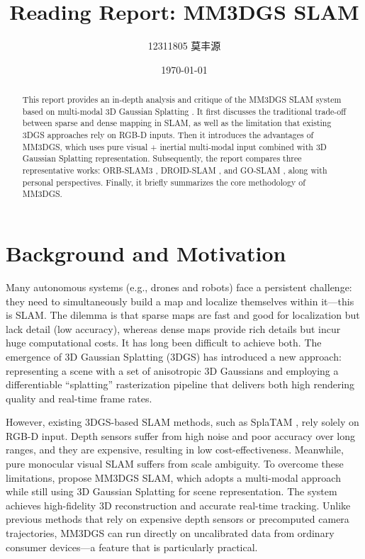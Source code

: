 \documentclass[12pt,a4paper,onecolumn]{article}
\begin{document}
\title{\textbf{Reading Report: MM3DGS SLAM}}
\author{12311805 莫丰源}
\date{\today}
\maketitle

\begin{abstract}
This report provides an in-depth analysis and critique of the MM3DGS SLAM system based on multi-modal 3D Gaussian Splatting \citep{MM3DGS}. It first discusses the traditional trade-off between sparse and dense mapping in SLAM, as well as the limitation that existing 3DGS approaches rely on RGB-D inputs. Then it introduces the advantages of MM3DGS, which uses pure visual + inertial multi-modal input combined with 3D Gaussian Splatting representation. Subsequently, the report compares three representative works: ORB-SLAM3 \citep{ORB-SLAM3}, DROID-SLAM \citep{DROID-SLAM}, and GO-SLAM \citep{GO-SLAM}, along with personal perspectives. Finally, it briefly summarizes the core methodology of MM3DGS.
\end{abstract}

\section{Background and Motivation}

Many autonomous systems (e.g., drones and robots) face a persistent challenge: they need to simultaneously build a map and localize themselves within it—this is SLAM. The dilemma is that sparse maps are fast and good for localization but lack detail (low accuracy), whereas dense maps provide rich details but incur huge computational costs. It has long been difficult to achieve both. The emergence of 3D Gaussian Splatting (3DGS) has introduced a new approach: representing a scene with a set of anisotropic 3D Gaussians and employing a differentiable ``splatting'' rasterization pipeline that delivers both high rendering quality and real-time frame rates.

However, existing 3DGS-based SLAM methods, such as SplaTAM \citep{SplaTAM}, rely solely on RGB-D input. Depth sensors suffer from high noise and poor accuracy over long ranges, and they are expensive, resulting in low cost-effectiveness. Meanwhile, pure monocular visual SLAM suffers from scale ambiguity. To overcome these limitations, \citet{MM3DGS} propose MM3DGS SLAM, which adopts a multi-modal approach while still using 3D Gaussian Splatting for scene representation. The system achieves high-fidelity 3D reconstruction and accurate real-time tracking. Unlike previous methods that rely on expensive depth sensors or precomputed camera trajectories, MM3DGS can run directly on uncalibrated data from ordinary consumer devices—a feature that is particularly practical.
\end{document}
